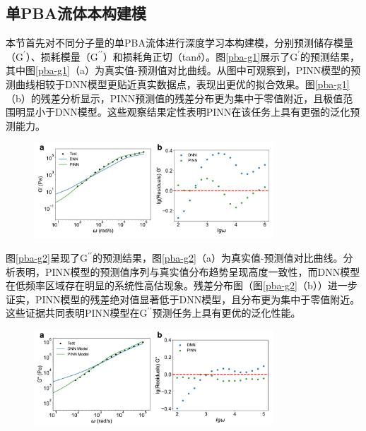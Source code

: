 \subsection{单PBA流体本构建模}
本节首先对不同分子量的单PBA流体进行深度学习本构建模，分别预测储存模量（$\mathrm{G^{\prime}}$）、损耗模量（$\mathrm{G^{\prime\prime}}$）和损耗角正切（tan$\delta$）。图\ref{pba-g1}展示了$\mathrm{G^{\prime}}$的预测结果，其中图\ref{pba-g1}（a）为真实值-预测值对比曲线。从图中可观察到，PINN模型的预测曲线相较于DNN模型更贴近真实数据点，表现出更优的拟合效果。图\ref{pba-g1}（b）的残差分析显示，PINN预测值的残差分布更为集中于零值附近，且极值范围明显小于DNN模型。这些观察结果定性表明PINN在该任务上具有更强的泛化预测能力。
\begin{figure}[htbp]
  \centering
  \includegraphics[width=0.8\textwidth]{Fig/pba-g1.pdf}
\end{figure}

图\ref{pba-g2}呈现了$\mathrm{G^{\prime\prime}}$的预测结果，图\ref{pba-g2}（a）为真实值-预测值对比曲线。分析表明，PINN模型的预测值序列与真实值分布趋势呈现高度一致性，而DNN模型在低频率区域存在明显的系统性高估现象。残差分布图（图\ref{pba-g2}（b））进一步证实，PINN模型的残差绝对值显著低于DNN模型，且分布更为集中于零值附近。这些证据共同表明PINN模型在$\mathrm{G^{\prime\prime}}$预测任务上具有更优的泛化性能。
\begin{figure}[htbp]
  \centering
  \includegraphics[width=0.8\textwidth]{Fig/pba-g2.pdf}
\end{figure}


